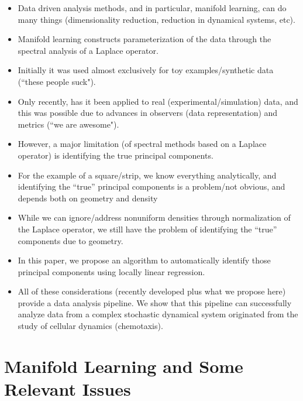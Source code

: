\documentclass[preprint]{elsarticle}
\begin{document}
\begin{itemize}

\item
Data driven analysis methods, and in particular, manifold learning, can do many things (dimensionality reduction, reduction in dynamical systems, etc). 

\item
Manifold learning constructs parameterization of the data through the spectral analysis of a Laplace operator.

\item
Initially it was used almost exclusively for toy examples/synthetic data (``these people suck").

\item
Only recently, has it been applied to real (experimental/simulation) data, and this was possible due to advances in observers (data representation) and metrics (``we are awesome"). 

\item
However, a major limitation (of spectral methods based on a Laplace operator) is identifying the true principal components.

\item For the example of a square/strip, we know everything analytically, and identifying the ``true'' principal components is a problem/not obvious, and depends both on geometry and density

\item While we can ignore/address nonuniform densities through normalization of the Laplace operator, we still have the problem of identifying the ``true'' components due to geometry. 

\item
In this paper, we propose an algorithm to automatically identify those principal components using locally linear regression.

\item
All of these considerations (recently developed plus what we propose here) provide a data analysis pipeline. We show that this pipeline can successfully analyze data from a complex stochastic dynamical system originated from the study of cellular dynamics (chemotaxis).

\end{itemize}



\section{Manifold Learning and Some Relevant Issues}
\end{document}
